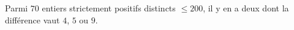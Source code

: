 Parmi $70$ entiers strictement positifs distincts $\leq 200$, il y en a deux dont la différence vaut $4$, $5$ ou $9$.
